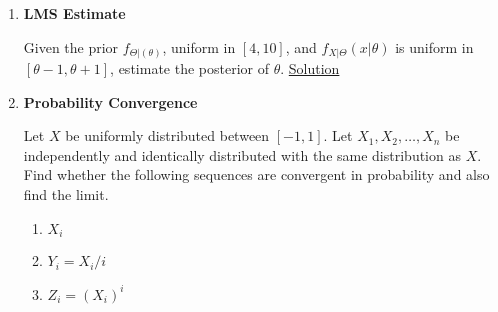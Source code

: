 \documentclass[../probability-notes.tex]{subfiles}
\begin{document}
\begin{enumerate}
    \item \hypertarget{q_lmsestimate}{\textbf{LMS Estimate}}\newline
    Given the prior $f_{\Theta|(\theta)}$, uniform in $[4,10]$, and $f_{X|\Theta}(x|\theta)$ is uniform in $[\theta-1, \theta+1]$, estimate the posterior of $\theta$. \hyperlink{a_lmsestimate}{Solution}

    \item \hypertarget{q_convergence}{\textbf{Probability Convergence}}\newline
    Let $X$ be uniformly distributed between $[-1,1]$. Let $X_{1}, X_{2},\ldots,X_{n}$ be independently and identically distributed with the same distribution as $X$. Find whether the following sequences are convergent in probability and also find the limit.
    \begin{enumerate}
        \item $X_{i}$
        \item $Y_{i} = X_{i}/i$
        \item $Z_{i} = (X_{i})^{i}$
    \end{enumerate}

    \end{enumerate}
\end{document}
